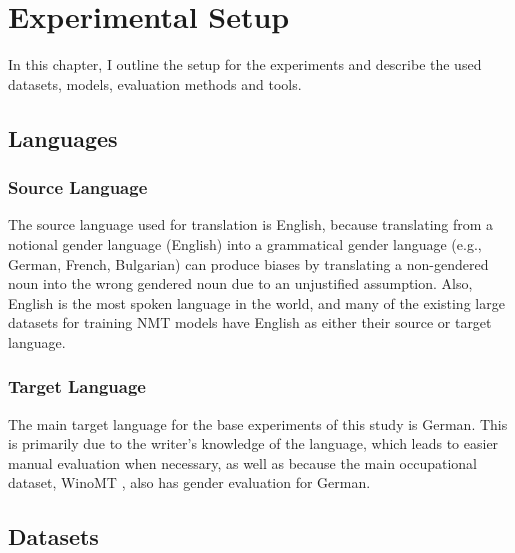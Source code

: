 \chapter{Experimental Setup}
\label{ch:Setup}

In this chapter, I outline the setup for the experiments and describe the used datasets, models, evaluation methods and tools.

\section{Languages}
\label{sec:Setup:Languages}


\subsection{Source Language} 
The source language used for translation is English, because translating from a notional gender language (English) into a grammatical gender language (e.g., German, French, Bulgarian) can produce biases by translating a non-gendered noun into the wrong gendered noun due to an unjustified assumption. Also, English is the most spoken language in the world, and many of the existing large datasets for training NMT models have English as either their source or target language.

\subsection{Target Language} 
The main target language for the base experiments of this study is German. This is primarily due to the writer's knowledge of the language, which leads to easier manual evaluation when necessary, as well as because the main occupational dataset, WinoMT \parencite{Stanovsky_2019}, also has gender evaluation for German.


\section{Datasets}
\label{sec:Setup:Datasets}

